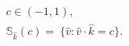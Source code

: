\documentclass[preview]{standalone}
\begin{document}
\begin{align*}
c \in (-1,1),\\ \mathbb{S}_{\hat k}(c) =\
                         \{ \hat v : \hat v \cdot \hat k = c \}.
\end{align*}
\end{document}
